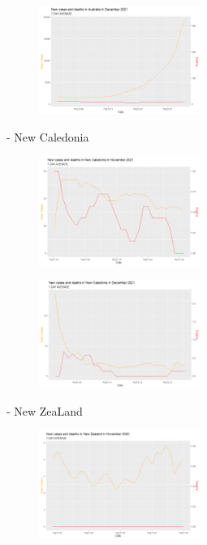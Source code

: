 \documentclass[a4paper]{article}
\theoremstyle{definition}
\begin{document}
\begin{enumerate}[i)]
\begin{enumerate}[1)]
		\begin{figure} [!htp]
  		\centering
  		\includegraphics [width=0.47\textwidth] {Images/aus_cad_12}
		\end{figure}
	- New Caledonia\\
		\begin{figure} [!htp]
  		\centering
  		\includegraphics [width=0.47\textwidth] {Images/cal_cad_3}
		\end{figure}
		
		\begin{figure} [!htp]
  		\centering
  		\includegraphics [width=0.47\textwidth] {Images/cal_cad_4}
		\end{figure}
	- New ZeaLand\\
	   	\begin{figure} [!htp]
  		\centering
  		\includegraphics [width=0.47\textwidth] {Images/zea_cad_9}
		\end{figure}
		

\end{enumerate}
\end{enumerate}
\end{document}
